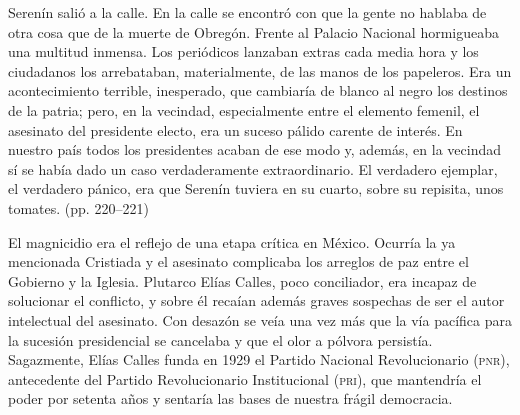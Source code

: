 \documentclass[14pt,twoside,final]{extbook} %
\begin{document}
\begin{quoting}
Serenín salió a la calle. En la calle se encontró con que la gente no hablaba de otra cosa que de la muerte de Obregón. Frente al Palacio Nacional hormigueaba una multitud inmensa. Los periódicos lanzaban extras cada media hora y los ciudadanos los arrebataban, materialmente, de las manos de los papeleros. Era un acontecimiento terrible, inesperado, que cambiaría de blanco al negro los destinos de la patria; pero, en la vecindad, especialmente entre el elemento femenil, el asesinato del presidente electo, era un suceso pálido carente de interés. En nuestro país todos los presidentes acaban de ese modo y, además, en la vecindad sí se había dado un caso verdaderamente extraordinario. El verdadero ejemplar, el verdadero pánico, era que Serenín tuviera en su cuarto, sobre su repisita, unos tomates. (pp. 220--221)
\end{quoting}
El magnicidio era el reflejo de una etapa crítica en México. Ocurría la ya mencionada Cristiada y el asesinato complicaba los arreglos de paz entre el Gobierno y la Iglesia. Plutarco Elías Calles, poco conciliador, era incapaz de solucionar el conflicto, y sobre él recaían además graves sospechas de ser el autor intelectual del asesinato. Con desazón se veía una vez más que la vía pacífica para la sucesión presidencial se cancelaba y que el olor a pólvora persistía. Sagazmente, Elías Calles funda en 1929 el Partido Nacional Revolucionario (\textsc{pnr}), antecedente del Partido Revolucionario Institucional (\textsc{pri}), que mantendría el poder por setenta años y sentaría las bases de nuestra frágil democracia.
\end{document}
